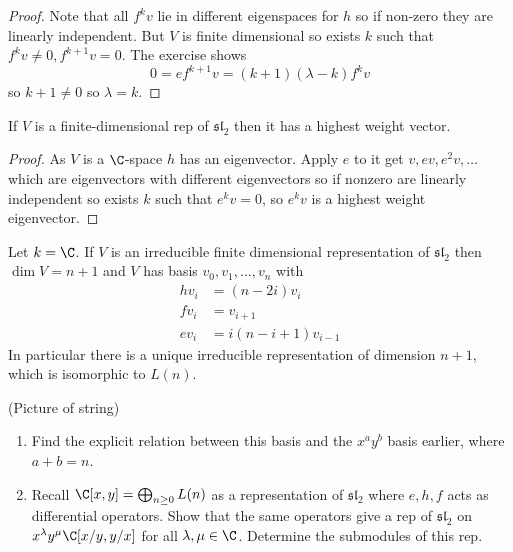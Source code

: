 \documentclass[a4paper]{article}
\newcommand*{\Lie}[1]{\mathfrak{#1}} %
\begin{document}
\begin{proof}
  Note that all \(f^k v\) lie in different eigenspaces for \(h\) so if non-zero they are linearly independent. But \(V\) is finite dimensional so exists \(k\) such that \(f^k v \neq 0, f^{k + 1} v = 0\). The exercise shows
  \[
    0 = ef^{k + 1}v = (k + 1)( \lambda - k)f^k v
  \]
  so \(k + 1 \neq 0\) so \(\lambda = k\).
\end{proof}

\begin{lemma}
  If \(V\) is a finite-dimensional rep of \(\Lie{sl}_2\) then it has a highest weight vector.
\end{lemma}

\begin{proof}
  As \(V\) is a \(\C\)-space \(h\) has an eigenvector. Apply \(e\) to it get \(v, ev, e^2v, \dots\) which are eigenvectors with different eigenvectors so if nonzero are linearly independent so exists \(k\) such that \(e^kv = 0\), so \(e^kv\) is a highest weight eigenvector.
\end{proof}

\begin{corollary}
  Let \(k = \C\). If \(V\) is an irreducible finite dimensional representation of \(\Lie{sl}_2\) then \(\dim V = n + 1\) and \(V\) has basis \(v_0, v_1, \dots, v_n\) with
  \begin{align*}
    hv_i &= (n - 2i) v_i \\
    fv_i &= v_{i + 1} \\
    ev_i &= i (n - i + 1) v_{i - 1}
  \end{align*}
  In particular there is a unique irreducible representation of dimension \(n + 1\), which is isomorphic to \(L(n)\).
\end{corollary}

(Picture of string)

\begin{ex}\leavevmode
  \begin{enumerate}
  \item Find the explicit relation between this basis and the \(x^ay^b\) basis earlier, where \(a + b = n\).
  \item Recall \(\C[x, y] = \bigoplus_{n \geq 0} L(n)\) as a representation of \(\Lie{sl}_2\) where \(e, h, f\) acts as differential operators. Show that the same operators give a rep of \(\Lie{sl}_2\) on \(x^\lambda y^\mu \C[x/y, y/x]\) for all \(\lambda, \mu \in \C\). Determine the submodules of this rep.
  \end{enumerate}
\end{ex}
\end{document}
